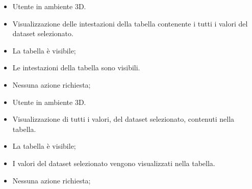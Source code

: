 \UCdsc
    { %
        \begin{itemize}
            \item Utente in ambiente 3D.
        \end{itemize}
    }
    { %
        \begin{itemize}
            \item Visualizzazione delle intestazioni della tabella contenente i tutti i valori del dataset selezionato.
        \end{itemize}
    }
    { %
        \begin{itemize}
            \item La tabella è visibile;
        \end{itemize}
    }
    { %
        \begin{itemize}
            \item Le intestazioni della tabella sono visibili.
        \end{itemize}
    }
    { %
        \begin{itemize}
            \item Nessuna azione richiesta;
        \end{itemize}
    }

\UCdsc
    { %
        \begin{itemize}
            \item Utente in ambiente 3D.
        \end{itemize}
    }
    { %
        \begin{itemize}
            \item Visualizzazione di tutti i valori, del dataset selezionato, contenuti nella tabella.
        \end{itemize}
    }
    { %
        \begin{itemize}
            \item La tabella è visibile;
        \end{itemize}
    }
    { %
        \begin{itemize}
            \item I valori del dataset selezionato vengono visualizzati nella tabella.
        \end{itemize}
    }
    { %
        \begin{itemize}
            \item Nessuna azione richiesta;
        \end{itemize}
    }

